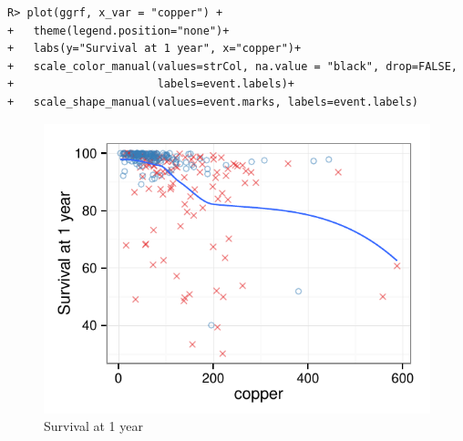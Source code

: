 \documentclass[nojss]{jss}\usepackage[]{graphicx}\usepackage[]{color}
\makeatletter
\def\maxwidth{ %
  \ifdim\Gin@nat@width>\linewidth
    \linewidth
  \else
    \Gin@nat@width
  \fi
}
\newenvironment{kframe}{%
 \def\at@end@of@kframe{}%
 \ifinner\ifhmode%
  \def\at@end@of@kframe{\end{minipage}}%
  \begin{minipage}{\columnwidth}%
 \fi\fi%
 \def\FrameCommand##1{\hskip\@totalleftmargin \hskip-\fboxsep
 \colorbox{shadecolor}{##1}\hskip-\fboxsep
     \hskip-\linewidth \hskip-\@totalleftmargin \hskip\columnwidth}%
 \MakeFramed {\advance\hsize-\width
   \@totalleftmargin\z@ \linewidth\hsize
   \@setminipage}}%
 {\par\unskip\endMakeFramed%
 \at@end@of@kframe}
\newenvironment{knitrout}{}{} %
\makeatother
\begin{document}
\begin{knitrout}\footnotesize
{}\color{fgcolor}\begin{kframe}
\begin{verbatim}
R> plot(ggrf, x_var = "copper") +
+   theme(legend.position="none")+
+   labs(y="Survival at 1 year", x="copper")+
+   scale_color_manual(values=strCol, na.value = "black", drop=FALSE,
+                      labels=event.labels)+
+   scale_shape_manual(values=event.marks, labels=event.labels)
\end{verbatim}
\end{kframe}\begin{figure}[!htpb]

{\centering \includegraphics[width=\maxwidth]{figure/rfs-variable-plotCopper-1} 

}

\caption[Survival at 1 year]{Survival at 1 year\label{fig:variable-plotCopper}}
\end{figure}


\end{knitrout}
\end{document}
